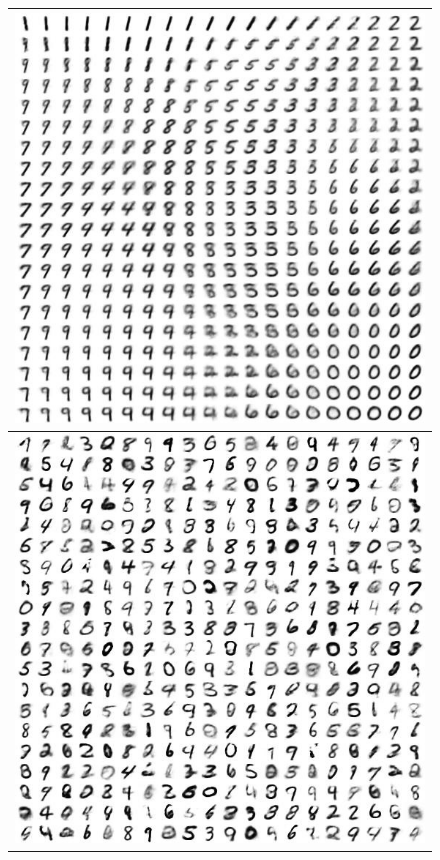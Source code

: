 \documentclass[letterpaper, twoside]{article}
\begin{document}
\begin{figure}[H]
\centering
\begin{minipage}{.33\textwidth}
\begin{flushleft}
\begin{tabular}{|@{}c@{}|}
\includegraphics[scale=0.5]{manifold_18.jpg}\\ \hline
\includegraphics[scale=0.5]{manifold_19.jpg}\\ \hline

\end{tabular}
\end{flushleft}
\end{minipage}
\end{figure}
\end{document}
